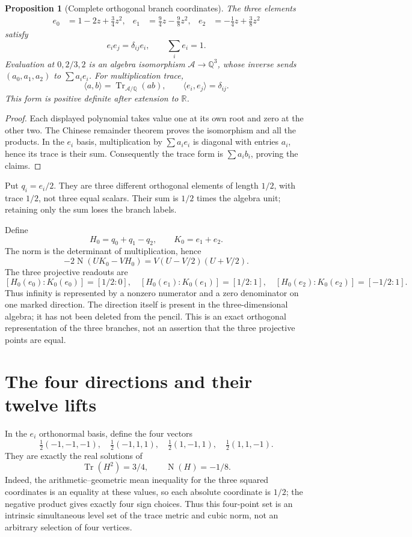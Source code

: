 \documentclass[11pt]{article}
\newtheorem{proposition}[theorem]{Proposition}
\theoremstyle{remark}\newtheorem{remark}[theorem]{Remark}
\newcommand{\Q}{\mathbb Q}\newcommand{\R}{\mathbb R}\newcommand{\C}{\mathbb C}
\newcommand{\Tr}{\operatorname{Tr}}\newcommand{\Nm}{\operatorname{N}}
\begin{document}
\begin{proposition}[Complete orthogonal branch coordinates]
The three elements
\begin{align*}
 e_0&=1-2z+\tfrac34z^2,&
 e_1&=\tfrac94z-\tfrac98z^2,&
 e_2&=-\tfrac14z+\tfrac38z^2
\end{align*}
satisfy
\[
 e_ie_j=\delta_{ij}e_i,\qquad \sum_i e_i=1.
\]
Evaluation at $0,2/3,2$ is an algebra isomorphism $\mathcal A\to\Q^3$, whose inverse sends $(a_0,a_1,a_2)$ to $\sum a_ie_i$. For multiplication trace,
\[
 \langle a,b\rangle=\Tr_{\mathcal A/\Q}(ab),\qquad
 \langle e_i,e_j\rangle=\delta_{ij}.
\]
This form is positive definite after extension to $\R$.
\end{proposition}
\begin{proof}
Each displayed polynomial takes value one at its own root and zero at the other two. The Chinese remainder theorem proves the isomorphism and all the products. In the $e_i$ basis, multiplication by $\sum a_ie_i$ is diagonal with entries $a_i$, hence its trace is their sum. Consequently the trace form is $\sum a_ib_i$, proving the claims.
\end{proof}

Put $q_i=e_i/2$. They are three different orthogonal elements of length $1/2$, with trace $1/2$, not three equal scalars. Their sum is $1/2$ times the algebra unit; retaining only the sum loses the branch labels.

Define
\[
 H_0=q_0+q_1-q_2,\qquad K_0=e_1+e_2.
\]
The norm is the determinant of multiplication, hence
\begin{equation}\label{eq:pencil}
 -2\Nm(UK_0-VH_0)=V(U-V/2)(U+V/2).
\end{equation}
The three projective readouts are
\[
 [H_0(e_0):K_0(e_0)]=[1/2:0],\quad
 [H_0(e_1):K_0(e_1)]=[1/2:1],\quad
 [H_0(e_2):K_0(e_2)]=[-1/2:1].
\]
Thus infinity is represented by a nonzero numerator and a zero denominator on one marked direction. The direction itself is present in the three-dimensional algebra; it has not been deleted from the pencil. This is an exact orthogonal representation of the three branches, not an assertion that the three projective points are equal.

\section{The four directions and their twelve lifts}
In the $e_i$ orthonormal basis, define the four vectors
\begin{equation}\label{eq:tetra}
 \tfrac12(-1,-1,-1),\quad
 \tfrac12(-1,1,1),\quad
 \tfrac12(1,-1,1),\quad
 \tfrac12(1,1,-1).
\end{equation}
They are exactly the real solutions of
\[
 \Tr(H^2)=3/4,\qquad \Nm(H)=-1/8.
\]
Indeed, the arithmetic--geometric mean inequality for the three squared coordinates is an equality at these values, so each absolute coordinate is $1/2$; the negative product gives exactly four sign choices. Thus this four-point set is an intrinsic simultaneous level set of the trace metric and cubic norm, not an arbitrary selection of four vertices.
\end{document}
